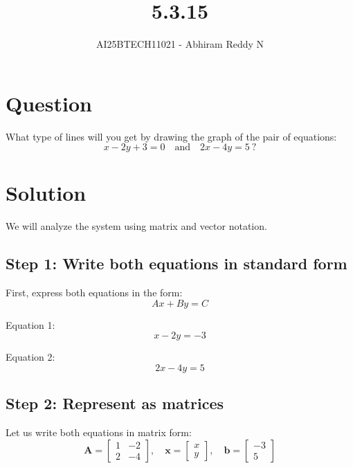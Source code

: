 \documentclass[journal]{IEEEtran}
\begin{document}

\vspace{3cm}

\title{5.3.15}
\author{AI25BTECH11021 - Abhiram Reddy N}
{\let\newpage\relax\maketitle}

\renewcommand{\thefigure}{\theenumi}
\renewcommand{\thetable}{\theenumi}
\setlength{\intextsep}{10pt} %


\renewcommand{\thetable}{\theenumi}


\section*{Question}
What type of lines will you get by drawing the graph of the pair of equations:
\[
x - 2y + 3 = 0 \quad \text{and} \quad 2x - 4y = 5\ ?
\]

\section*{Solution}

We will analyze the system using matrix and vector notation.

\subsection*{Step 1: Write both equations in standard form}

First, express both equations in the form:
\[
Ax + By = C
\]

Equation 1:
\begin{equation}
x - 2y = -3
\label{eq1}
\end{equation}

Equation 2:
\begin{equation}
2x - 4y = 5
\label{eq2}
\end{equation}

\subsection*{Step 2: Represent as matrices}

Let us write both equations in matrix form:
\begin{equation}
\mathbf{A} = \begin{bmatrix} 1 & -2 \\ 2 & -4 \end{bmatrix}, \quad
\mathbf{x} = \begin{bmatrix} x \\ y \end{bmatrix}, \quad
\mathbf{b} = \begin{bmatrix} -3 \\ 5 \end{bmatrix}
\end{equation}
\end{document}
